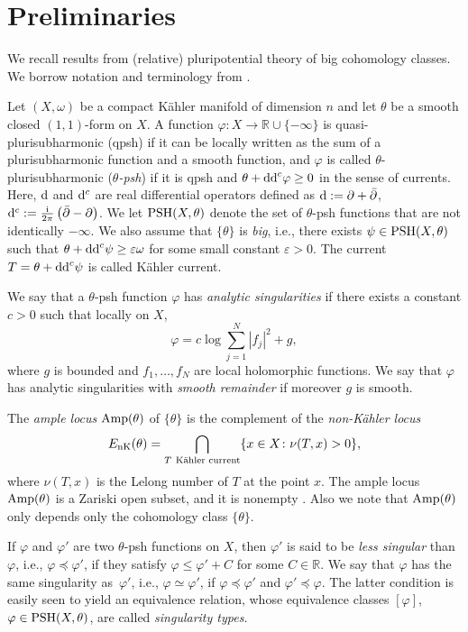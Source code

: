 \documentclass[pdftex]{sigma}
\numberwithin{equation}{section}
\theoremstyle{plain}
\newcommand{\vep}{\varepsilon}
\newcommand \psh {{\rm PSH}}
\newcommand \Amp {{\rm Amp}}
\begin{document}
\section{Preliminaries}\label{sec:prelim}

We recall results from (relative) pluripotential theory of big cohomology classes. We borrow notation and terminology from \cite{DDL6}.

Let $(X,\omega)$ be a compact K\"ahler manifold of dimension $n$ and let $\theta$ be a smooth closed $(1,1)$-form on $X$. A function $\varphi\colon X\rightarrow \mathbb{R}\cup\{-\infty\}$ is quasi-plurisubharmonic (qpsh) if it can be locally written as the sum of a plurisubharmonic function and a smooth function, and $\varphi$ is called $\theta$-plurisubharmonic ($\theta$\emph{-psh}) if it is qpsh and $\theta+{\rm dd}^c \varphi\geq 0$ in the sense of currents. Here, ${\rm d}$ and ${\rm d}^c$ are real differential operators defined as ${\rm d}:=\partial +\bar{\partial}$, ${\rm d}^c:=\frac{\rm i}{2\pi}\left(\bar{\partial}-\partial \right)$. We let $\psh(X,\theta)$ denote the set of $\theta$-psh functions that are not identically $-\infty$.
We also assume that $\{\theta\}$ is \emph{big}, i.e., there exists $\psi \in {\rm PSH}(X,\theta)$ such that $\theta +{\rm dd}^c \psi \geq \vep \omega$ for some small constant $\vep>0$. The current $T=\theta+{\rm dd}^c\psi$ is called K\"ahler current.

We say that a $\theta$-psh function $\varphi$ has \emph{analytic singularities} if there exists a constant $c>0$ such that locally on $X$,
\[
\varphi={c}\log\sum_{j=1}^{N}|f_j|^2+g,
\]
where $g$ is bounded and $f_1,\dots,f_N$ are local holomorphic functions.
We say that $\varphi$ has analytic singularities with \emph{smooth remainder} if moreover $g$ is smooth.

The \emph{ample locus} $\Amp(\theta)$ of $\{\theta\}$ is the complement of the \emph{non-K\"ahler locus}
\[E_{\rm nK}(\theta)= \bigcap_{T \ {\text{K\"ahler current}}} \{x\in X \colon \nu(T,x)>0 \},\]
where $\nu(T,x)$ is the Lelong number of $T$ at the point $x$.
The ample locus $\Amp(\theta)$ is a Zariski open subset, and it is nonempty \cite{Bou04}. Also we note that $\Amp(\theta)$ only depends only the cohomology class $\{ \theta\}$.

If $\varphi$ and $\varphi'$ are two $\theta$-psh functions on $X$, then $\varphi'$ is said to be \emph{less singular} than $\varphi$, i.e., $\varphi \preceq \varphi'$, if they satisfy $\varphi\le\varphi'+C$ for some $C\in \mathbb{R}$.
We say that $\varphi$ has the same singularity as~$\varphi'$, i.e., $\varphi \simeq \varphi'$, if $\varphi \preceq \varphi'$ and $\varphi' \preceq \varphi$. The latter condition is easily seen to yield an equivalence relation, whose equivalence classes $[\varphi]$, $\varphi \in \psh(X, \theta)$, are called \emph{singularity types}.
\end{document}
